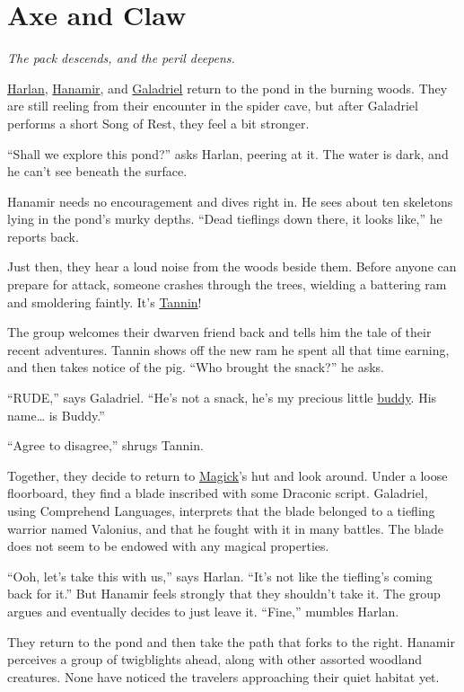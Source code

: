 \documentclass[smalldemyvopaper,11pt,twoside,onecolumn,openright,extrafontsizes]{memoir}
\newcommand{\chapdesc}[1]{
    \begin{flushright}
    \emph{{#1}}
    \end{flushright}
    \vspace{26pt}
}
\begin{document}
\chapter{Axe and Claw}
\chapdesc{The pack descends, and the peril deepens.}

\href{/characters/harlan/}{Harlan},
\href{/characters/hanamir/}{Hanamir}, and
\href{/characters/galadriel/}{Galadriel} return to the pond in the
burning woods. They are still reeling from their encounter in the spider
cave, but after Galadriel performs a short Song of Rest, they feel a bit
stronger.

``Shall we explore this pond?'' asks Harlan, peering at it. The water is
dark, and he can't see beneath the surface.

Hanamir needs no encouragement and dives right in. He sees about ten
skeletons lying in the pond's murky depths. ``Dead tieflings down there,
it looks like,'' he reports back.

Just then, they hear a loud noise from the woods beside them. Before
anyone can prepare for attack, someone crashes through the trees,
wielding a battering ram and smoldering faintly. It's
\href{/characters/tannin/}{Tannin}!

The group welcomes their dwarven friend back and tells him the tale of
their recent adventures. Tannin shows off the new ram he spent all that
time earning, and then takes notice of the pig. ``Who brought the
snack?'' he asks.

``RUDE,'' says Galadriel. ``He's not a snack, he's my precious little
\href{/characters/buddy/}{buddy}. His name\ldots{} is Buddy.''

``Agree to disagree,'' shrugs Tannin.

Together, they decide to return to \href{/characters/magick/}{Magick}'s
hut and look around. Under a loose floorboard, they find a blade
inscribed with some Draconic script. Galadriel, using Comprehend
Languages, interprets that the blade belonged to a tiefling warrior
named Valonius, and that he fought with it in many battles. The blade
does not seem to be endowed with any magical properties.

``Ooh, let's take this with us,'' says Harlan. ``It's not like the
tiefling's coming back for it.'' But Hanamir feels strongly that they
shouldn't take it. The group argues and eventually decides to just leave
it. ``Fine,'' mumbles Harlan.

They return to the pond and then take the path that forks to the right.
Hanamir perceives a group of twigblights ahead, along with other
assorted woodland creatures. None have noticed the travelers approaching
their quiet habitat yet.
\end{document}
